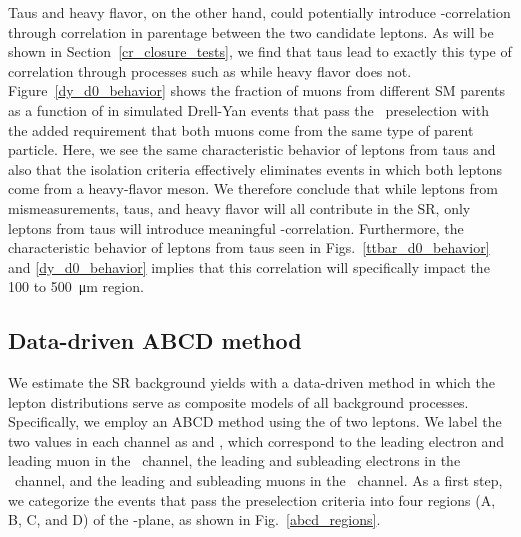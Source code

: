Taus and heavy flavor, on the other hand, could potentially introduce \ad-\ad correlation through correlation in parentage between the two candidate leptons. As will be shown in Section~\ref{cr_closure_tests}, we find that taus lead to exactly this type of correlation through processes such as \ztautaull while heavy flavor does not. Figure~\ref{dy_d0_behavior} shows the fraction of muons from different SM parents as a function of \ad in simulated Drell-Yan events that pass the \Pgm\Pgm\ preselection with the added requirement that both muons come from the same type of parent particle. Here, we see the same characteristic \ad behavior of leptons from taus and also that the isolation criteria effectively eliminates events in which both leptons come from a heavy-flavor meson. We therefore conclude that while leptons from mismeasurements, taus, and heavy flavor will all contribute in the SR, only leptons from taus will introduce meaningful \ad-\ad correlation. Furthermore, the characteristic \ad behavior of leptons from taus seen in Figs.~\ref{ttbar_d0_behavior} and \ref{dy_d0_behavior} implies that this correlation will specifically impact the \num{100} to \SI{500}{\um} region.



\subsection{Data-driven ABCD method}
\label{abcd}
We estimate the SR background yields with a data-driven method in which the lepton \ad distributions serve as composite models of all background processes. Specifically, we employ an ABCD method using the \ad of two leptons. We label the two \ad values in each channel as \ada and \adb, which correspond to the leading electron and leading muon in the \Pe\Pgm\ channel, the leading and subleading electrons in the \Pe\Pe\ channel, and the leading and subleading muons in the \Pgm\Pgm\ channel. As a first step, we categorize the events that pass the preselection criteria into four regions (A, B, C, and D) of the \ada-\adb plane, as shown in Fig.~\ref{abcd_regions}.



